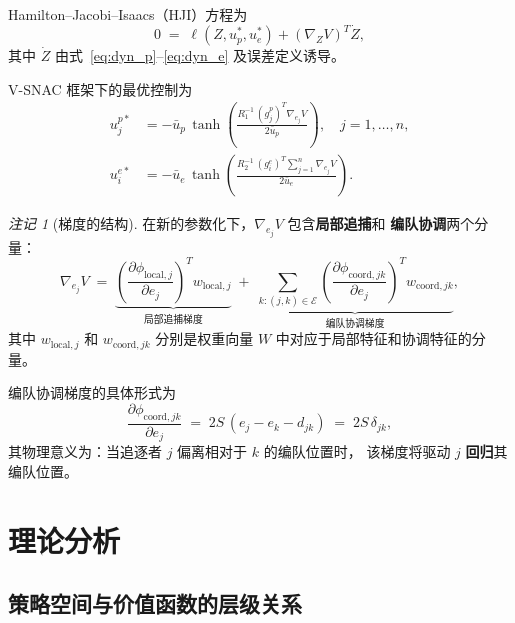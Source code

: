 \documentclass[a4paper,11pt]{article}
\theoremstyle{plain}
\theoremstyle{definition}
\theoremstyle{remark}
\newtheorem{remark}[theorem]{注记}
\newcommand{\cE}{\mathcal{E}}
\begin{document}
Hamilton--Jacobi--Isaacs（HJI）方程为
\begin{equation}\label{eq:HJI}
  0 \;=\; \ell(Z, u_p^*, u_e^*) + (\nabla_Z V)^T \dot{Z},
\end{equation}
其中 $\dot{Z}$ 由式~\eqref{eq:dyn_p}--\eqref{eq:dyn_e} 及误差定义诱导。

V-SNAC 框架下的最优控制为
\begin{align}
  u_j^{p*} &= -\bar{u}_p\, \tanh\!\left(
    \frac{R_1^{-1}\, (g_j^p)^T \nabla_{e_j} V}{2\bar{u}_p}
  \right), \quad j=1,\dots,n, \label{eq:u_p_star}\\[6pt]
  u_i^{e*} &= -\bar{u}_e\, \tanh\!\left(
    \frac{R_2^{-1}\, (g_i^e)^T \sum_{j=1}^{n} \nabla_{e_j} V}{2\bar{u}_e}
  \right). \label{eq:u_e_star}
\end{align}

\begin{remark}[梯度的结构]\label{rmk:gradient}
  在新的参数化下，$\nabla_{e_j} V$ 包含\textbf{局部追捕}和
  \textbf{编队协调}两个分量：
  \begin{equation}\label{eq:grad_decomp}
    \nabla_{e_j} V
    \;=\;
    \underbrace{
      \left(\frac{\partial \phi_{\text{local},j}}{\partial e_j}\right)^{\!T}
      w_{\text{local},j}
    }_{\text{局部追捕梯度}}
    \;+\;
    \underbrace{
      \sum_{k:(j,k)\in\cE}
      \left(\frac{\partial \phi_{\text{coord},jk}}{\partial e_j}\right)^{\!T}
      w_{\text{coord},jk}
    }_{\text{编队协调梯度}},
  \end{equation}
  其中 $w_{\text{local},j}$ 和 $w_{\text{coord},jk}$ 分别是权重向量 $W$
  中对应于局部特征和协调特征的分量。

  编队协调梯度的具体形式为
  \begin{equation}\label{eq:grad_coord}
    \frac{\partial \phi_{\text{coord},jk}}{\partial e_j}
    \;=\; 2S\,(e_j - e_k - d_{jk})
    \;=\; 2S\,\delta_{jk},
  \end{equation}
  其物理意义为：当追逐者 $j$ 偏离相对于 $k$ 的编队位置时，
  该梯度将驱动 $j$ \textbf{回归}其编队位置。
\end{remark}

\section{理论分析}\label{sec:theory}

\subsection{策略空间与价值函数的层级关系}
\end{document}

